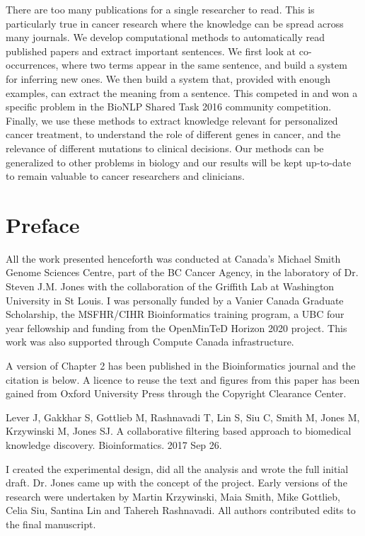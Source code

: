 There are too many publications for a single researcher to read. This is particularly true in cancer research where the knowledge can be spread across many journals. We develop computational methods to automatically read published papers and extract important sentences. We first look at co-occurrences, where two terms appear in the same sentence, and build a system for inferring new ones. We then build a system that, provided with enough examples, can extract the meaning from a sentence. This competed in and won a specific problem in the BioNLP Shared Task 2016 community competition. Finally, we use these methods to extract knowledge relevant for personalized cancer treatment, to understand the role of different genes in cancer, and the relevance of different mutations to clinical decisions. Our methods can be generalized to other problems in biology and our results will be kept up-to-date to remain valuable to cancer researchers and clinicians.

\chapter{Preface}

All the work presented henceforth was conducted at Canada’s Michael Smith Genome Sciences Centre, part of the BC Cancer Agency, in the laboratory of Dr. Steven J.M. Jones with the collaboration of the Griffith Lab at Washington University in St Louis. I was personally funded by a Vanier Canada Graduate Scholarship, the MSFHR/CIHR Bioinformatics training program, a UBC four year fellowship and funding from the OpenMinTeD Horizon 2020 project. This work was also supported through Compute Canada infrastructure.

A version of Chapter 2 has been published in the Bioinformatics journal and the citation is below. A licence to reuse the text and figures from this paper has been gained from Oxford University Press through the Copyright Clearance Center.

Lever J, Gakkhar S, Gottlieb M, Rashnavadi T, Lin S, Siu C, Smith M, Jones M, Krzywinski M, Jones SJ. A collaborative filtering based approach to biomedical knowledge discovery. Bioinformatics. 2017 Sep 26.

I created the experimental design, did all the analysis and wrote the full initial draft. Dr. Jones came up with the concept of the project. Early versions of the research were undertaken by Martin Krzywinski, Maia Smith, Mike Gottlieb, Celia Siu, Santina Lin and Tahereh Rashnavadi. All authors contributed edits to the final manuscript.

